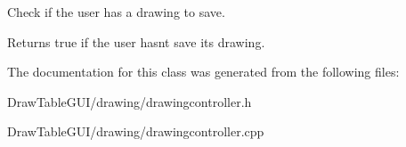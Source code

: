 Check if the user has a drawing to save. 

\begin{DoxyReturn}{Returns}
true if the user hasn\textquotesingle{}t save its drawing. 
\end{DoxyReturn}


The documentation for this class was generated from the following files\+:\begin{DoxyCompactItemize}
\item 
Draw\+Table\+G\+U\+I/drawing/drawingcontroller.\+h\item 
Draw\+Table\+G\+U\+I/drawing/drawingcontroller.\+cpp\end{DoxyCompactItemize}
